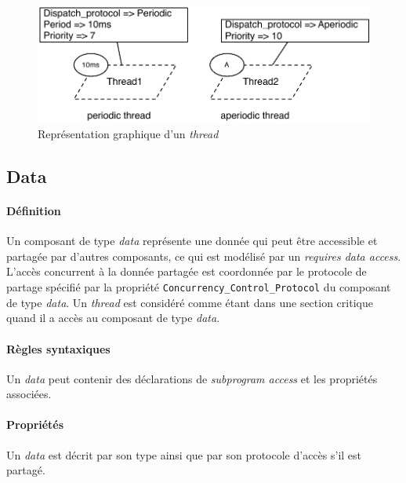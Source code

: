 \documentclass[11pt,a4paper]{paper}
\begin{document}
\begin{appendices}
\begin{figure}[htbp]
\begin{center}
\includegraphics[scale=.6]{figures_pdf/thread.pdf}
\caption{Représentation graphique d'un {\em thread}}
\end{center}
\end{figure}
\FloatBarrier

\subsection{Data}

\paragraph{Définition}

Un composant de type {\em data} représente une donnée qui peut être accessible et partagée par d'autres composants, ce qui est modélisé par un {\em requires data access}. L'accès concurrent à la donnée partagée est coordonnée par le protocole de partage spécifié par la propriété {\tt Concurrency\_Control\_Protocol} du composant de type {\em data}. Un  {\em thread} est considéré comme étant dans une section critique quand il a accès au composant de type {\em data}.


\paragraph{Règles syntaxiques} Un {\em data} peut contenir des déclarations de {\em subprogram access} et les propriétés associées.\\

\paragraph{Propriétés} Un {\em data} est décrit par son type ainsi que par son protocole d'accès s'il est partagé.


\end{appendices}
\end{document}
